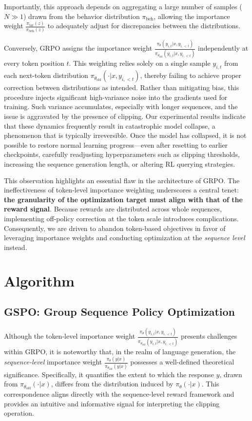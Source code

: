 Importantly, this approach depends on aggregating a large number of samples ($N \gg 1$) drawn from the behavior distribution $\pi_\text{beh}$, allowing the importance weight $\frac{ \pi_\text{tar} (z) }{ \pi_\text{beh} (z)}$ to adequately adjust for discrepancies between the distributions.

Conversely, GRPO assigns the importance weight $\frac{ \pi_{\theta} (y_{i,t} | x, y_{i,<t}) }{ \pi_{\theta_\text{old}} (y_{i,t} | x,y_{i,<t})}$ independently at every token position $t$. This weighting relies solely on a single sample $y_{i,t}$ from each next-token distribution $\pi_{\theta_\text{old}}( \cdot | x, y_{i, <t})$, thereby failing to achieve proper correction between distributions as intended. Rather than mitigating bias, this procedure injects significant high-variance noise into the gradients used for training. Such variance accumulates, especially with longer sequences, and the issue is aggravated by the presence of clipping. Our experimental results indicate that these dynamics frequently result in catastrophic model collapse, a phenomenon that is typically irreversible. Once the model has collapsed, it is not possible to restore normal learning progress—even after resetting to earlier checkpoints, carefully readjusting hyperparameters such as clipping thresholds, increasing the sequence generation length, or altering RL querying strategies.

This observation highlights an essential flaw in the architecture of GRPO. The ineffectiveness of token-level importance weighting underscores a central tenet: \textbf{the granularity of the optimization target must align with that of the reward signal}. Because rewards are distributed across whole sequences, implementing off-policy correction at the token scale introduces complications. Consequently, we are driven to abandon token-based objectives in favor of leveraging importance weights and conducting optimization at the \textit{sequence level} instead.

\section{Algorithm}

\subsection{GSPO: Group Sequence Policy Optimization}

Although the token-level importance weight $\frac{ \pi_{\theta} (y_{i,t} | x, y_{i,<t}) }{ \pi_{\theta_\text{old}} (y_{i,t} | x,y_{i,<t})}$ presents challenges within GRPO, it is noteworthy that, in the realm of language generation, the \textit{sequence-level} importance weight $\frac{ \pi_{\theta} (y | x) }{ \pi_{\theta_\text{old}} (y | x)}$ possesses a well-defined theoretical significance. Specifically, it quantifies the extent to which the response $y$, drawn from $\pi_{\theta_\text{old}} (\cdot | x)$, differs from the distribution induced by $\pi_{\theta} (\cdot | x)$. This correspondence aligns directly with the sequence-level reward framework and provides an intuitive and informative signal for interpreting the clipping operation.

